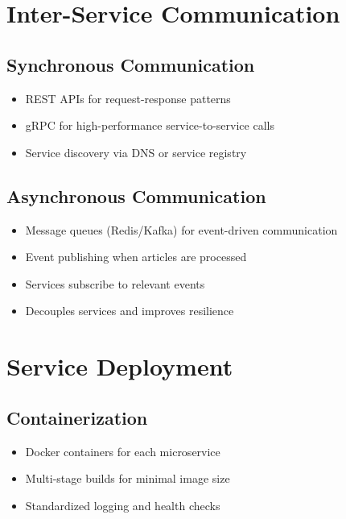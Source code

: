 \documentclass[12pt,a4paper]{report}
\begin{document}
\section{Inter-Service Communication}

\subsection{Synchronous Communication}

\begin{itemize}[label=\textbullet]
    \item REST APIs for request-response patterns
    \item gRPC for high-performance service-to-service calls
    \item Service discovery via DNS or service registry
\end{itemize}

\subsection{Asynchronous Communication}

\begin{itemize}[label=\textbullet]
    \item Message queues (Redis/Kafka) for event-driven communication
    \item Event publishing when articles are processed
    \item Services subscribe to relevant events
    \item Decouples services and improves resilience
\end{itemize}

\section{Service Deployment}

\subsection{Containerization}

\begin{itemize}[label=\textbullet]
    \item Docker containers for each microservice
    \item Multi-stage builds for minimal image size
    \item Standardized logging and health checks
\end{itemize}
\end{document}
